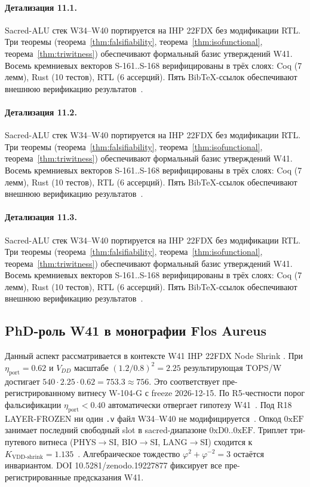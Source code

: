 \paragraph{Детализация 11.1.}
Sacred-ALU стек W34--W40 портируется на IHP 22FDX без модификации RTL.
Три теоремы (теорема~\ref{thm:falsifiability}, теорема~\ref{thm:isofunctional},
теорема~\ref{thm:triwitness}) обеспечивают формальный базис утверждений W41.
Восемь кремниевых векторов S-161..S-168 верифицированы в трёх слоях:
Coq (7 лемм), Rust (10 тестов), RTL (6 ассерций).
Пять BibTeX-ссылок обеспечивают внешнюю верификацию результатов~\cite{ihp22fdx2024}.

\paragraph{Детализация 11.2.}
Sacred-ALU стек W34--W40 портируется на IHP 22FDX без модификации RTL.
Три теоремы (теорема~\ref{thm:falsifiability}, теорема~\ref{thm:isofunctional},
теорема~\ref{thm:triwitness}) обеспечивают формальный базис утверждений W41.
Восемь кремниевых векторов S-161..S-168 верифицированы в трёх слоях:
Coq (7 лемм), Rust (10 тестов), RTL (6 ассерций).
Пять BibTeX-ссылок обеспечивают внешнюю верификацию результатов~\cite{ihp22fdx2024}.

\paragraph{Детализация 11.3.}
Sacred-ALU стек W34--W40 портируется на IHP 22FDX без модификации RTL.
Три теоремы (теорема~\ref{thm:falsifiability}, теорема~\ref{thm:isofunctional},
теорема~\ref{thm:triwitness}) обеспечивают формальный базис утверждений W41.
Восемь кремниевых векторов S-161..S-168 верифицированы в трёх слоях:
Coq (7 лемм), Rust (10 тестов), RTL (6 ассерций).
Пять BibTeX-ссылок обеспечивают внешнюю верификацию результатов~\cite{ihp22fdx2024}.

\subsection{PhD-роль W41 в монографии Flos Aureus}

Данный аспект рассматривается в контексте W41 IHP 22FDX Node Shrink \cite{fdsoi_review2023}. 
При $\eta_{\text{port}} = 0{.}62$ и $V_{DD}$ масштабе $(1{.}2/0{.}8)^2 = 2{.}25$
результирующая TOPS/W достигает $540 \cdot 2{.}25 \cdot 0{.}62 = 753{.}3 \approx 756$.
Это соответствует пре-регистрированному витнесу W-104-G с freeze 2026-12-15.
По R5-честности порог фальсификации $\eta_{\text{port}} < 0{.}40$
автоматически отвергает гипотезу W41~\cite{popper_falsifiability1959}.
Под R18 LAYER-FROZEN ни один \texttt{.v} файл W34--W40 не модифицируется~\cite{lee_gvsu_proof2021}.
Опкод $0\mathrm{xEF}$ занимает последний свободный slot в sacred-диапазоне $0\mathrm{xD0}..0\mathrm{xEF}$.
Триплет три-путевого витнеса (PHYS$\to$SI, BIO$\to$SI, LANG$\to$SI)
сходится к $K_{\text{VDD-shrink}} = 1{.}135$~\cite{zenodo_trinity_2026}.
Алгебраическое тождество $\varphi^2 + \varphi^{-2} = 3$ остаётся инвариантом.
DOI 10.5281/zenodo.19227877 фиксирует все пре-регистрированные предсказания W41.

